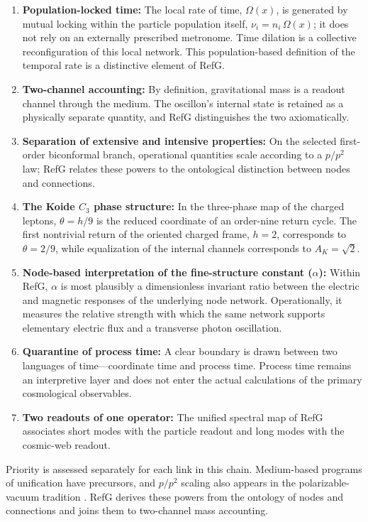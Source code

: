 \documentclass[11pt,a4paper]{article}
\begin{document}
\begin{enumerate}
\item \textbf{Population-locked time:} The local rate of time, \textbf{$\Omega(x)$}, is generated by mutual locking within the particle population itself, \textbf{$\nu_i=n_i\,\Omega(x)$}; it does not rely on an externally prescribed metronome. Time dilation is a collective reconfiguration of this local network. This population-based definition of the temporal rate is a distinctive element of RefG.
\item \textbf{Two-channel accounting:} By definition, gravitational mass is a readout channel through the medium. The oscillon's internal state is retained as a physically separate quantity, and RefG distinguishes the two axiomatically.
\item \textbf{Separation of extensive and intensive properties:} On the selected first-order biconformal branch, operational quantities scale according to a \textbf{$p/p^2$} law; RefG relates these powers to the ontological distinction between nodes and connections.
\item \textbf{The Koide $C_3$ phase structure:} In the three-phase map of the charged leptons, $\theta=h/9$ is the reduced coordinate of an order-nine return cycle. The first nontrivial return of the oriented charged frame, $h=2$, corresponds to $\theta=2/9$, while equalization of the internal channels corresponds to $A_K=\sqrt{2}$.
\item \textbf{Node-based interpretation of the fine-structure constant ($\alpha$):} Within RefG, $\alpha$ is most plausibly a dimensionless invariant ratio between the electric and magnetic responses of the underlying node network. Operationally, it measures the relative strength with which the same network supports elementary electric flux and a transverse photon oscillation.
\item \textbf{Quarantine of process time:} A clear boundary is drawn between two languages of time---coordinate time and process time. Process time remains an interpretive layer and does not enter the actual calculations of the primary cosmological observables.
\item \textbf{Two readouts of one operator:} The unified spectral map of RefG associates short modes with the particle readout and long modes with the cosmic-web readout.
\end{enumerate}

Priority is assessed separately for each link in this chain. Medium-based programs of unification have precursors, and $p/p^2$ scaling also appears in the polarizable-vacuum tradition \citep{dicke1957,puthoff2002}. RefG derives these powers from the ontology of nodes and connections and joins them to two-channel mass accounting.
\end{document}
